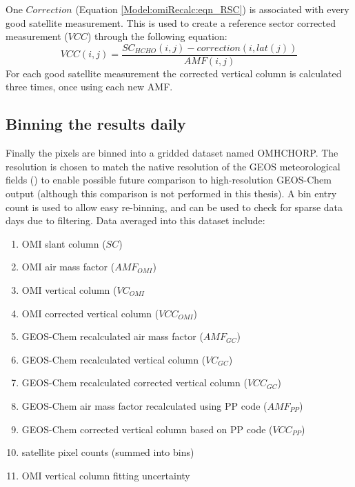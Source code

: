     One $Correction$ (Equation \ref{Model:omiRecalc:eqn_RSC}) is associated with every good satellite measurement.
    This is used to create a reference sector corrected measurement ($VCC$) through the following equation:
    \begin{equation}
    VCC(i,j) = \frac{SC_{HCHO}(i,j) - correction(i,lat(j))}{AMF(i,j)}
    \end{equation}
    For each good satellite measurement the corrected vertical column is calculated three times, once using each new AMF.
    
    

  \subsection{Binning the results daily}
    \label{Model:omiRecalc:binning}
    Finally the pixels are binned into a gridded dataset named OMHCHORP. 
    The resolution is chosen to match the native resolution of the GEOS meteorological fields (\highhr) to enable possible future comparison to high-resolution GEOS-Chem output (although this comparison is not performed in this thesis).
    A bin entry count is used to allow easy re-binning, and can be used to check for sparse data days due to filtering.
    Data averaged into this dataset include:
    \begin{enumerate}
      \item OMI slant column ($SC$)
      \item OMI air mass factor ($AMF_{OMI}$)
      \item OMI vertical column ($VC_{OMI}$
      \item OMI corrected vertical column ($VCC_{OMI}$) %
      \item GEOS-Chem recalculated air mass factor ($AMF_{GC}$)
      \item GEOS-Chem recalculated vertical column ($VC_{GC}$)
      \item GEOS-Chem recalculated corrected vertical column ($VCC_{GC}$)
      \item GEOS-Chem air mass factor recalculated using PP code ($AMF_{PP}$)
      \item GEOS-Chem corrected vertical column based on PP code ($VCC_{PP}$)
      \item satellite pixel counts (summed into bins)
      \item OMI vertical column fitting uncertainty
    \end{enumerate}
    
